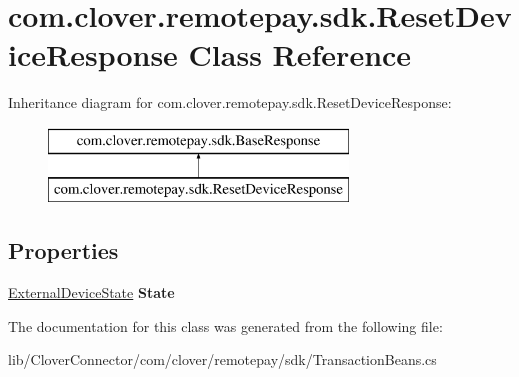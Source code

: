 \hypertarget{classcom_1_1clover_1_1remotepay_1_1sdk_1_1_reset_device_response}{}\section{com.\+clover.\+remotepay.\+sdk.\+Reset\+Device\+Response Class Reference}
\label{classcom_1_1clover_1_1remotepay_1_1sdk_1_1_reset_device_response}
Inheritance diagram for com.\+clover.\+remotepay.\+sdk.\+Reset\+Device\+Response\+:\begin{figure}[H]
\begin{center}
\leavevmode
\includegraphics[height=2.000000cm]{classcom_1_1clover_1_1remotepay_1_1sdk_1_1_reset_device_response}
\end{center}
\end{figure}
\subsection*{Properties}
\begin{DoxyCompactItemize}
\item 
\mbox{\label{classcom_1_1clover_1_1remotepay_1_1sdk_1_1_reset_device_response_ac9afc35f4074129aad891e3f3d3dc79a}} 
\hyperlink{namespacecom_1_1clover_1_1remotepay_1_1sdk_a9d5838a91e2711306ad561d104fed034}{External\+Device\+State} {\bfseries State}
\end{DoxyCompactItemize}


The documentation for this class was generated from the following file\+:\begin{DoxyCompactItemize}
\item 
lib/\+Clover\+Connector/com/clover/remotepay/sdk/Transaction\+Beans.\+cs\end{DoxyCompactItemize}
